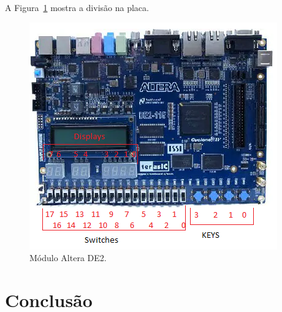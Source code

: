\documentclass[11pt,a4paper,titlepage]{article}
\begin{document}
A Figura~\ref{fig:fpga} mostra a divisão na placa.

\begin{figure}[h]
\centering
\includegraphics[]{images/FPGA.png}
\caption{Módulo Altera DE2.}
\label{fig:fpga}
\end{figure}


\section{Conclusão}
\end{document}
